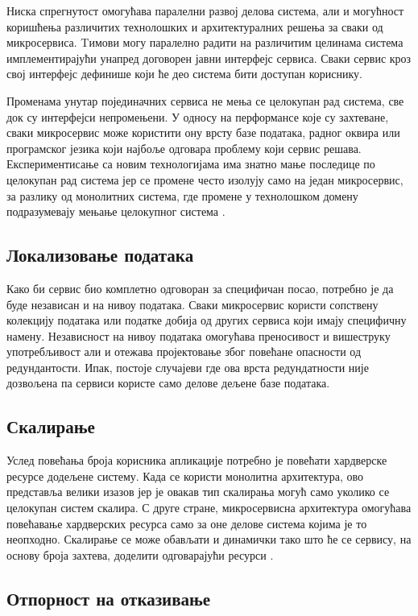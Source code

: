 \documentclass[12pt,oneside]{memoir}
\begin{document}
Ниска спрегнутост омогућава паралелни развој делова система, али и могућност коришћења различитих технолошких и архитектуралних решења за сваки од микросервиса. Tимови могу паралелно радити на различитим целинама система имплементирајући унапред договорен јавни интерфејс сервиса. Сваки сервис кроз свој интерфејс дефинише који ће део система бити доступан кориснику.

Променама унутар појединачних сервиса не мења се целокупан рад система, све док су интерфејси непромењени. У односу на перформансе које су захтеване, сваки микросервис може користити ону врсту базе података, радног оквира или програмског језика који најбоље одговара проблему који сервис решава. Експериментисање са новим технологијама има знатно мање последице по целокупан рад система јер се промене често изолују само на један микросервис, за разлику од монолитних система, где промене у технолошком домену подразумевају мењање целокупног система \cite{microservicesBook}.


\subsection{Локализовање података}

Како би сервис био комплетно одговоран за специфичан посао, потребно је да буде независан и на нивоу података. Сваки микросервис користи сопствену колекцију података или податке добија од других сервиса који имају специфичну намену. Независност на нивоу података омогућава преносивост и вишеструку употребљивост али и отежава пројектовање због повећане опасности од редундантости. Ипак, постоје случајеви где ова врста редундатности није дозвољена па сервиси користе само делове дељене базе података.


\subsection{Скалирање}

Услед повећања броја корисника апликације потребно је повећати хардверске ресурсе додељене систему. Када се користи монолитна архитектура, ово представља велики изазов јер је овакав тип скалирања могућ само уколико се целокупан систем скалира. С друге стране, микросервисна архитектура омогућава повећавање хардверских ресурса само за оне делове система којима је то неопходно. Скалирање се може обављати и динамички тако што ће се сервису, на основу броја захтева, доделити одговарајући ресурси \cite{microservicesBook}.


\subsection{Отпорност на отказивање}
\end{document}
